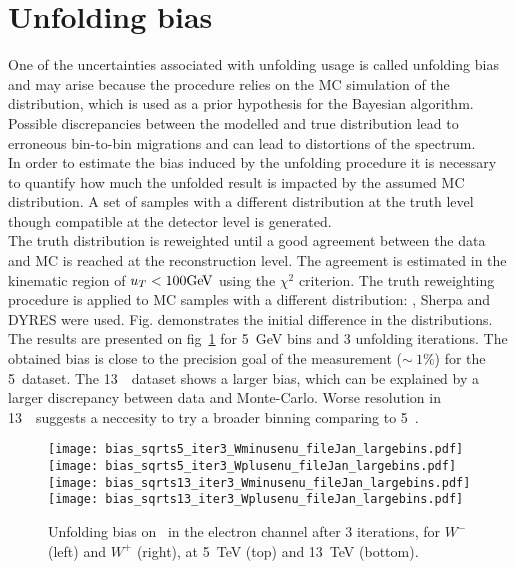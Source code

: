 \section{Unfolding bias}
One of the uncertainties associated with unfolding usage is called unfolding bias and may arise because the procedure relies on the MC simulation of the distribution, which is used as a prior hypothesis for the Bayesian algorithm. Possible discrepancies between the modelled and true distribution lead to erroneous  bin-to-bin migrations and can lead to distortions of the spectrum.\\
In order to estimate the bias induced by the unfolding procedure it is necessary to quantify how much the unfolded result is impacted by the assumed MC distribution. A set of samples with a different distribution at the truth level though compatible at the detector level is generated. \\

The truth distribution is reweighted until a good agreement between the data and MC is reached at the reconstruction level. The agreement is estimated in the kinematic region of $u_T<100\text{Ge\kern -0.1em V}$ using the $\chi^2$ criterion. The truth reweighting procedure is applied to MC samples with a different distribution: \Pythia, Sherpa and DYRES were used. Fig. demonstrates the initial difference in the distributions.\\

The results are presented on fig~\ref{fig:BiasResultLargeBins} for 5~GeV bins and 3 unfolding iterations. The obtained bias is close to the precision goal of the measurement ($\sim~1\%$) for the 5~\TeV dataset. The 13~\TeV\ dataset shows a larger bias, which can be explained by a larger discrepancy between data and Monte-Carlo. Worse resolution in 13~\TeV\ suggests a neccesity to try a broader binning comparing to 5~\GeV.

\begin{figure}[h]
	\centering
	{\texttt{[image: bias\_sqrts5\_iter3\_Wminusenu\_fileJan\_largebins.pdf]}}
	{\texttt{[image: bias\_sqrts5\_iter3\_Wplusenu\_fileJan\_largebins.pdf]}}\\
	{\texttt{[image: bias\_sqrts13\_iter3\_Wminusenu\_fileJan\_largebins.pdf]}}
	{\texttt{[image: bias\_sqrts13\_iter3\_Wplusenu\_fileJan\_largebins.pdf]}}
	\caption{Unfolding bias on \ptw\ in the electron channel after 3 iterations, for $W^-$ (left) and $W^+$ (right), at 5~TeV (top) and 13~TeV (bottom).}
	\label{fig:BiasResultLargeBins}
\end{figure}
\clearpage




